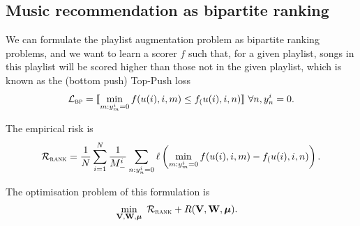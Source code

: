 \subsection{Music recommendation as bipartite ranking}

We can formulate the playlist augmentation problem as bipartite ranking problems, 
and we want to learn a scorer $f$ such that, for a given playlist, 
songs in this playlist will be scored higher than those not in the given playlist,
which is known as the (bottom push) Top-Push loss~\cite{li2014top}
\begin{equation*}
\mathcal{L}_\textsc{bp} = \llbracket \min_{m: y_m^i=0} f(u(i), i, m) \le f_(u(i), i, n) \rrbracket \ \forall n, y_n^i = 0.
\end{equation*}

The empirical risk is
$$
\mathcal{R}_\textsc{rank} 
= \frac{1}{N} \sum_{i=1}^N \frac{1}{M_-^i} \sum_{n: y_n^i = 0} \ell \left( \min_{m: y_m^i = 0} f(u(i), i, m) - f_(u(i), i, n) \right).
$$

The optimisation problem of this formulation is
\begin{equation}
\label{eq:unconsopt}
\begin{aligned}
&\min_{\mathbf{V}, \mathbf{W}, \bm{\mu}} \ \mathcal{R}_\textsc{rank} + R(\mathbf{V}, \mathbf{W}, \bm{\mu}).
\end{aligned}
\end{equation}

